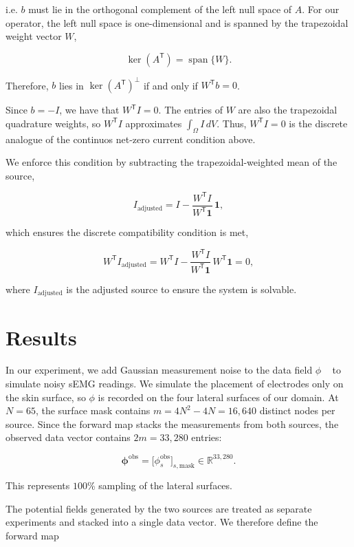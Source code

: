 \documentclass[final-report]{report-template}
\begin{document}
i.e. $b$ must lie in the orthogonal complement of the left null space of $A$. For our operator, the left null space is one-dimensional and is spanned by the trapezoidal weight vector \(W\),

$$
\ker(A^{\mathsf T})=\operatorname{span}\{W\}.
$$

Therefore, $b$ lies in $\ker(A^{\mathsf T})^\perp$ if and only if $W^{\mathsf T}b=0$.

Since $b=-I$, we have that $W^{\mathsf T}I=0$. The entries of $W$ are also the trapezoidal quadrature weights, so $W^{\mathsf T}I$ approximates $\int_\Omega I\,dV$. Thus, $W^{\mathsf T}I=0$ is the discrete analogue of the continuos net-zero current condition above.

We enforce this condition by subtracting the trapezoidal-weighted mean of the source,

$$
I_{\text{adjusted}}
=
I-
\frac{W^{\mathsf T}I}{W^{\mathsf T}\mathbf{1}}\,\mathbf{1},
$$

which ensures the discrete compatibility condition is met,

$$
W^{\mathsf T}I_{\mathrm{adjusted}}
=
W^{\mathsf T}I
-
\frac{W^{\mathsf T}I}{W^{\mathsf T}\mathbf{1}}\,
W^{\mathsf T}\mathbf{1}
= 0,
$$

where $I_{\text{adjusted}}$ is the adjusted source to ensure the system is solvable.


\section{Results}

In our experiment, we add Gaussian measurement noise to the data field $\phi$ ~\cite{vandendoel2011} to simulate noisy sEMG readings. We simulate the placement of electrodes only on the skin surface, so $\phi$ is recorded on the four lateral surfaces of our domain. At $N=65$, the surface mask contains $m=4N^2-4N=16,640$ distinct nodes per source. Since the forward map stacks the measurements from both sources, the observed data vector contains $2m=33,280$ entries:

$$
\boldsymbol{\phi}^{\mathrm{obs}}
=
\bigl[\phi_s^{\mathrm{obs}}\bigr]_{s,\mathrm{mask}}
\in\mathbb{R}^{33,280}.
$$

This represents $100$\% sampling of the lateral surfaces.

The potential fields generated by the two sources are treated as separate experiments and stacked into a single data vector. We therefore define the forward map
\end{document}
